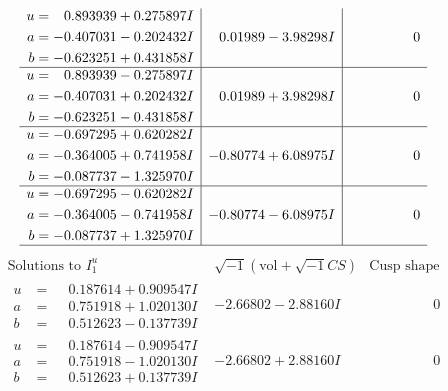 \documentclass[1p]{elsarticle_modified}
\theoremstyle{definition}
\newcommand{\I}{\sqrt{-1}}
\begin{document}
$$\begin{array}{c|c|c}
\begin{aligned}
u &= \phantom{-}0.893939 + 0.275897 I \\
a &= -0.407031 - 0.202432 I \\
b &= -0.623251 + 0.431858 I\end{aligned}
 & \phantom{-}0.01989 - 3.98298 I & \phantom{-0.000000 } 0 \\ \hline\begin{aligned}
u &= \phantom{-}0.893939 - 0.275897 I \\
a &= -0.407031 + 0.202432 I \\
b &= -0.623251 - 0.431858 I\end{aligned}
 & \phantom{-}0.01989 + 3.98298 I & \phantom{-0.000000 } 0 \\ \hline\begin{aligned}
u &= -0.697295 + 0.620282 I \\
a &= -0.364005 + 0.741958 I \\
b &= -0.087737 - 1.325970 I\end{aligned}
 & -0.80774 + 6.08975 I & \phantom{-0.000000 } 0 \\ \hline\begin{aligned}
u &= -0.697295 - 0.620282 I \\
a &= -0.364005 - 0.741958 I \\
b &= -0.087737 + 1.325970 I\end{aligned}
 & -0.80774 - 6.08975 I & \phantom{-0.000000 } 0\\
 \hline 
 \end{array}$$\newpage$$\begin{array}{c|c|c}  
\text{Solutions to }I^u_{1}& \I (\text{vol} + \sqrt{-1}CS) & \text{Cusp shape}\\
 \hline 
\begin{aligned}
u &= \phantom{-}0.187614 + 0.909547 I \\
a &= \phantom{-}0.751918 + 1.020130 I \\
b &= \phantom{-}0.512623 - 0.137739 I\end{aligned}
 & -2.66802 - 2.88160 I & \phantom{-0.000000 } 0 \\ \hline\begin{aligned}
u &= \phantom{-}0.187614 - 0.909547 I \\
a &= \phantom{-}0.751918 - 1.020130 I \\
b &= \phantom{-}0.512623 + 0.137739 I\end{aligned}
 & -2.66802 + 2.88160 I & \phantom{-0.000000 } 0 \\ \hline\begin{aligned}

\end{aligned}
\end{array}$$
\end{document}
